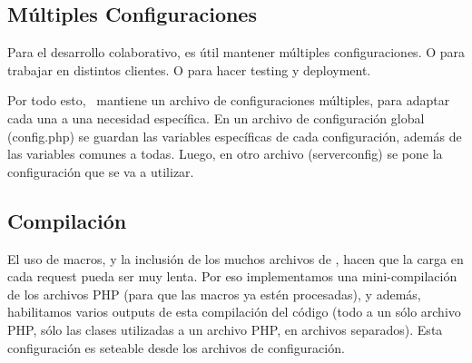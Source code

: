 \subsection{Múltiples Configuraciones}
\label{sub-config}
Para el desarrollo colaborativo, es útil mantener múltiples configuraciones. O para trabajar en distintos clientes. O para hacer testing y deployment.

Por todo esto, \PWB \ mantiene un archivo de configuraciones múltiples, para adaptar cada una a una necesidad específica. En un archivo de configuración global (config.php) se guardan las variables específicas de cada configuración, además de las variables comunes a todas. Luego, en otro archivo (serverconfig) se pone la configuración que se va a utilizar.

\subsection{Compilación}

El uso de macros, y la inclusión de los muchos archivos de \PWB, hacen que la carga en cada request pueda ser muy lenta. Por eso implementamos una mini-compilación de los archivos PHP (para que las macros ya estén procesadas), y además, habilitamos varios outputs de esta compilación del código (todo a un sólo archivo PHP, sólo las clases utilizadas a un archivo PHP, en archivos separados). Esta configuración es seteable desde los archivos de configuración.